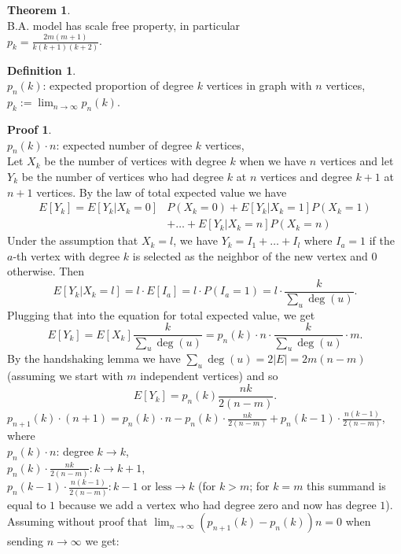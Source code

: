 \documentclass[a4paper, 12pt]{book}
\theoremstyle{definition}
\newtheorem{defn}[counter]{Definition}
\newtheorem{theorem}[counter]{Theorem}
\newtheorem{pro}[counter]{Proof}
\theoremstyle{remark}
\begin{document}
\begin{theorem} \text{} \\
  B.A. model has scale free property, in particular \\
  $p_k = \frac{2 m (m+1)}{k (k+1) (k+2)}$.
\end{theorem}
\begin{defn} \text{} \\
  $p_n(k)$: expected proportion of degree $k$ vertices in graph with $n$ vertices, \\
  $p_k := \lim_{n \to \infty} p_n(k)$.
\end{defn}
\begin{pro} \text{} \\
  $p_n(k) \cdot n$: expected number of degree $k$ vertices, \\
  Let $X_k$ be the number of vertices with degree $k$ when we have $n$ vertices and let $Y_k$ be the number of vertices who had degree $k$ at $n$ vertices and degree $k + 1$ at $n + 1$ vertices.
  By the law of total expected value we have 
  \begin{align*}
    E[Y_k] = E[Y_k | X_k = 0]&P(X_k = 0) + E[Y_k | X_k = 1]P(X_k = 1)\\ &+ \ldots + E[Y_k | X_k = n]P(X_k = n)  
  \end{align*}
  Under the assumption that $X_k = l$, we have $Y_k = I_1 + \ldots + I_l$ where $I_a = 1$ if the $a$-th vertex with degree $k$ is selected as the neighbor of the new vertex and $0$ otherwise.
  Then $$E[Y_k | X_k = l] = l \cdot E[I_a] = l \cdot P(I_a = 1) = l \cdot \frac{k}{\sum_u \deg(u)}.$$
  Plugging that into the equation for total expected value, we get 
  $$E[Y_k] = E[X_k]\frac{k}{\sum_u \deg(u)} = p_n(k) \cdot n \cdot \frac{k}{\sum_u \deg(u)} \cdot m.$$
  By the handshaking lemma we have $\sum_u \deg(u) = 2 |E| = 2m(n - m)$ (assuming we start with $m$ independent vertices) and so
  $$E[Y_k] = p_n(k)\frac{nk}{2(n - m)}.$$
  $p_{n+1}(k) \cdot (n+1) = p_n(k) \cdot n - p_n(k) \cdot \frac{nk}{2(n - m)} + p_n(k-1) \cdot \frac{n(k-1)}{2(n - m)}$, where \\
  $p_n(k) \cdot n$: degree $k \to k$, \\
  $p_n(k) \cdot \frac{nk}{2(n - m)}: k \to k+1$, \\
  $p_n(k-1) \cdot \frac{n(k-1)}{2(n - m)}: k-1\text{ or less} \to k$ (for $k > m$; for $k = m$ this summand is equal to $1$ because we add a vertex who had degree zero and now has degree $1$). \\
  Assuming without proof that $\lim_{n\to \infty}(p_{n+1}(k) - p_n(k))n = 0$ when sending $n \to \infty$ we get: \\

\end{pro}
\end{document}
